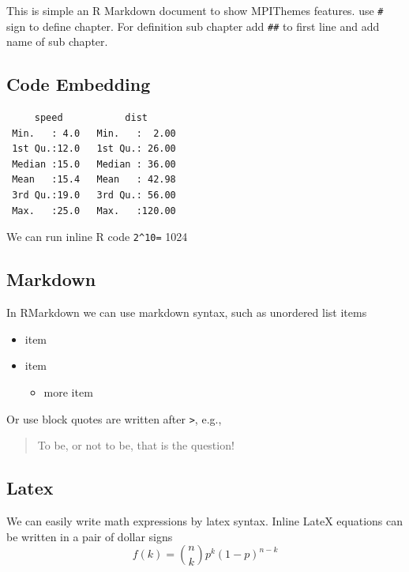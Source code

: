 \documentclass[
]{article}
\providecommand{\tightlist}{%
  \setlength{\itemsep}{0pt}\setlength{\parskip}{0pt}}
\begin{document}
This is simple an R Markdown document to show MPIThemes features. use
\texttt{\#} sign to define chapter. For definition sub chapter add
\texttt{\#\#} to first line and add name of sub chapter.

\hypertarget{code-embedding}{%
\subsection{Code Embedding}\label{code-embedding}}

\begin{verbatim}
     speed           dist       
 Min.   : 4.0   Min.   :  2.00  
 1st Qu.:12.0   1st Qu.: 26.00  
 Median :15.0   Median : 36.00  
 Mean   :15.4   Mean   : 42.98  
 3rd Qu.:19.0   3rd Qu.: 56.00  
 Max.   :25.0   Max.   :120.00  
\end{verbatim}

We can run inline R code \texttt{2\^{}10=} 1024

\hypertarget{markdown}{%
\subsection{Markdown}\label{markdown}}

In RMarkdown we can use markdown syntax, such as unordered list items

\begin{itemize}
\tightlist
\item
  item
\item
  item

  \begin{itemize}
  \tightlist
  \item
    more item
  \end{itemize}
\end{itemize}

Or use block quotes are written after \texttt{\textgreater{}}, e.g.,

\begin{quote}
To be, or not to be, that is the question!
\end{quote}

\hypertarget{latex}{%
\subsection{Latex}\label{latex}}

We can easily write math expressions by latex syntax. Inline LateX
equations can be written in a pair of dollar signs
\[f\left(k\right)=\binom{n}{k}p^k\left(1-p\right)^{n-k}\]
\end{document}
